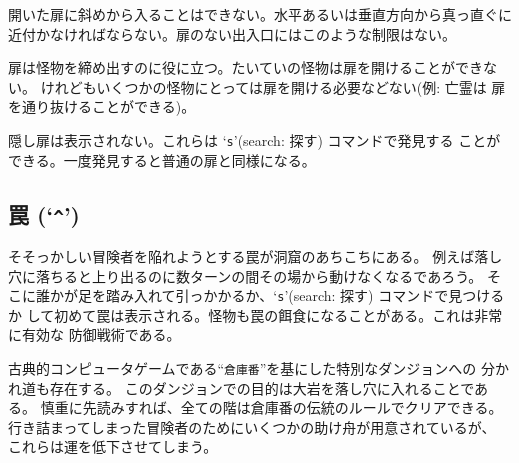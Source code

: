 開いた扉に斜めから入ることはできない。水平あるいは垂直方向から真っ直ぐに
近付かなければならない。扉のない出入口にはこのような制限はない。

扉は怪物を締め出すのに役に立つ。たいていの怪物は扉を開けることができない。
けれどもいくつかの怪物にとっては扉を開ける必要などない(例: 亡霊は
扉を通り抜けることができる)。

隠し扉は表示されない。これらは `{\tt s}'(search: 探す) コマンドで発見する
ことができる。一度発見すると普通の扉と同様になる。

\subsection*{罠 (`{\tt \^{}}')}

そそっかしい冒険者を陥れようとする罠が洞窟のあちこちにある。
例えば落し穴に落ちると上り出るのに数ターンの間その場から動けなくなるであろう。
そこに誰かが足を踏み入れて引っかかるか、`{\tt s}'(search: 探す) コマンドで見つけるか
して初めて罠は表示される。怪物も罠の餌食になることがある。これは非常に有効な
防御戦術である。

古典的コンピュータゲームである``{\tt 倉庫番}''を基にした特別なダンジョンへの
分かれ道も存在する。
このダンジョンでの目的は大岩を落し穴に入れることである。
慎重に先読みすれば、全ての階は倉庫番の伝統のルールでクリアできる。
行き詰まってしまった冒険者のためにいくつかの助け舟が用意されているが、
これらは運を低下させてしまう。

